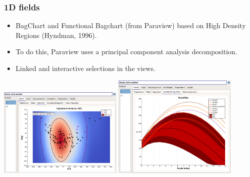 \documentclass{beamer}
\begin{document}
\begin{frame}
\frametitle{1D fields}
	
\begin{itemize}
\item BagChart and Functional Bagchart (from Paraview) 
based on High Density Regions (Hyndman, 1996).
\item To do this, Paraview uses a principal component analysis  
decomposition. 
\item Linked and interactive selections in the views. 
\end{itemize}

\begin{center}
\includegraphics[width=0.45\textwidth]{figures/persalys-field-bagchart.png}
\includegraphics[width=0.45\textwidth]{figures/persalys-field-functional-bagchart.png}
\end{center}

\end{frame}

\end{document}
